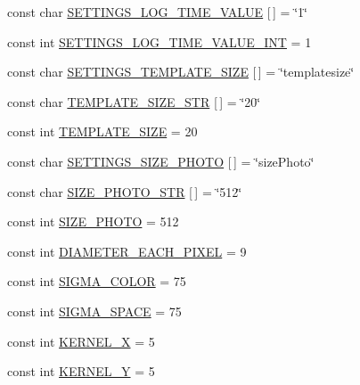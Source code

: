 \begin{DoxyCompactItemize}
\item 
const char \mbox{\hyperlink{namespaceyenot_ae00932245c3089d385ef8ee3463df8ca}{S\+E\+T\+T\+I\+N\+G\+S\+\_\+\+L\+O\+G\+\_\+\+T\+I\+M\+E\+\_\+\+V\+A\+L\+UE}} \mbox{[}$\,$\mbox{]} = \char`\"{}1\char`\"{}
\item 
const int \mbox{\hyperlink{namespaceyenot_abc8b052e7f097163709fa71c4da4478d}{S\+E\+T\+T\+I\+N\+G\+S\+\_\+\+L\+O\+G\+\_\+\+T\+I\+M\+E\+\_\+\+V\+A\+L\+U\+E\+\_\+\+I\+NT}} = 1
\item 
const char \mbox{\hyperlink{namespaceyenot_a347fa05f62ae28e55301db755cf26210}{S\+E\+T\+T\+I\+N\+G\+S\+\_\+\+T\+E\+M\+P\+L\+A\+T\+E\+\_\+\+S\+I\+ZE}} \mbox{[}$\,$\mbox{]} = \char`\"{}templatesize\char`\"{}
\item 
const char \mbox{\hyperlink{namespaceyenot_acfc97705229a010013bb0433327bf707}{T\+E\+M\+P\+L\+A\+T\+E\+\_\+\+S\+I\+Z\+E\+\_\+\+S\+TR}} \mbox{[}$\,$\mbox{]} = \char`\"{}20\char`\"{}
\item 
const int \mbox{\hyperlink{namespaceyenot_a6c04317b4747d569efcf92266bb1051b}{T\+E\+M\+P\+L\+A\+T\+E\+\_\+\+S\+I\+ZE}} = 20
\item 
const char \mbox{\hyperlink{namespaceyenot_a6a132f52235e5b9454c850b4f5343ce3}{S\+E\+T\+T\+I\+N\+G\+S\+\_\+\+S\+I\+Z\+E\+\_\+\+P\+H\+O\+TO}} \mbox{[}$\,$\mbox{]} = \char`\"{}size\+Photo\char`\"{}
\item 
const char \mbox{\hyperlink{namespaceyenot_a172f1253ba2c664d26caffab97a6253d}{S\+I\+Z\+E\+\_\+\+P\+H\+O\+T\+O\+\_\+\+S\+TR}} \mbox{[}$\,$\mbox{]} = \char`\"{}512\char`\"{}
\item 
const int \mbox{\hyperlink{namespaceyenot_a501462c649059c5efe3019823a607670}{S\+I\+Z\+E\+\_\+\+P\+H\+O\+TO}} = 512
\item 
const int \mbox{\hyperlink{namespaceyenot_ad85720cad8409ab5ef5cc47afc84645c}{D\+I\+A\+M\+E\+T\+E\+R\+\_\+\+E\+A\+C\+H\+\_\+\+P\+I\+X\+EL}} = 9
\item 
const int \mbox{\hyperlink{namespaceyenot_affd7404833d15c98fbd85249f43f98da}{S\+I\+G\+M\+A\+\_\+\+C\+O\+L\+OR}} = 75
\item 
const int \mbox{\hyperlink{namespaceyenot_ad45191f613b95ca3398e6eab5e202406}{S\+I\+G\+M\+A\+\_\+\+S\+P\+A\+CE}} = 75
\item 
const int \mbox{\hyperlink{namespaceyenot_aa753d0e3e99fb4b37b3930996bdfe563}{K\+E\+R\+N\+E\+L\+\_\+X}} = 5
\item 
const int \mbox{\hyperlink{namespaceyenot_a33a5af73a30e2b5684ee02cc4bf4c374}{K\+E\+R\+N\+E\+L\+\_\+Y}} = 5
\item 

\end{DoxyCompactItemize}
